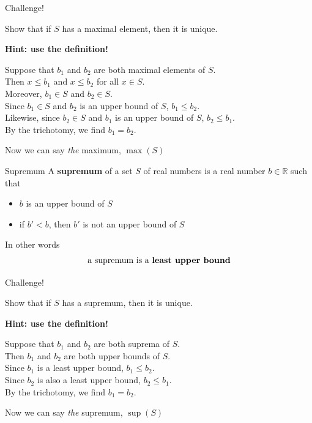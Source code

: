 \documentclass{beamer}
\begin{document}
\begin{frame}{Challenge!}
\begin{prob}
Show that if $S$ has a maximal element, then it is unique.
\end{prob}
\pause
\textbf{Hint: use the definition!}
\pause
\begin{soln}
Suppose that $b_1$ and $b_2$ are both maximal elements of $S$.\\
\pause
Then $x\leq b_1$ and $x\leq b_2$ for all $x\in S$.\\
\pause
Moreover, $b_1\in S$ and $b_2\in S$.\\
\pause
Since $b_1\in S$ and $b_2$ is an upper bound of $S$, $b_1\leq b_2$.\\
\pause
Likewise, since $b_2\in S$ and $b_1$ is an upper bound of $S$, $b_2\leq b_1$.\\
\pause
By the trichotomy, we find $b_1=b_2$.
\end{soln}
\pause
Now we can say \emph{the} maximum, $\max(S)$
\end{frame}

\begin{frame}{Supremum}
A \textbf{supremum} of a set $S$ of real numbers is a real number $b\in\mathbb{R}$ such that
\begin{itemize}
\item $b$ is an upper bound of $S$
\item if $b'<b$, then $b'$ is not an upper bound of $S$
\end{itemize}
\pause
In other words
$$\text{a supremum is a \bf{least upper bound}}$$
\end{frame}

\begin{frame}{Challenge!}
\begin{prob}
Show that if $S$ has a supremum, then it is unique.
\end{prob}
\pause
\textbf{Hint: use the definition!}
\pause
\begin{soln}
Suppose that $b_1$ and $b_2$ are both suprema of $S$.\\
\pause
Then $b_1$ and $b_2$ are both upper bounds of $S$.\\
\pause
Since $b_1$ is a least upper bound, $b_1\leq b_2$.\\
\pause
Since $b_2$ is also a least upper bound, $b_2\leq b_1$.\\
\pause
By the trichotomy, we find $b_1=b_2$.
\end{soln}
\pause
Now we can say \emph{the} supremum, $\sup(S)$
\end{frame}
\end{document}
